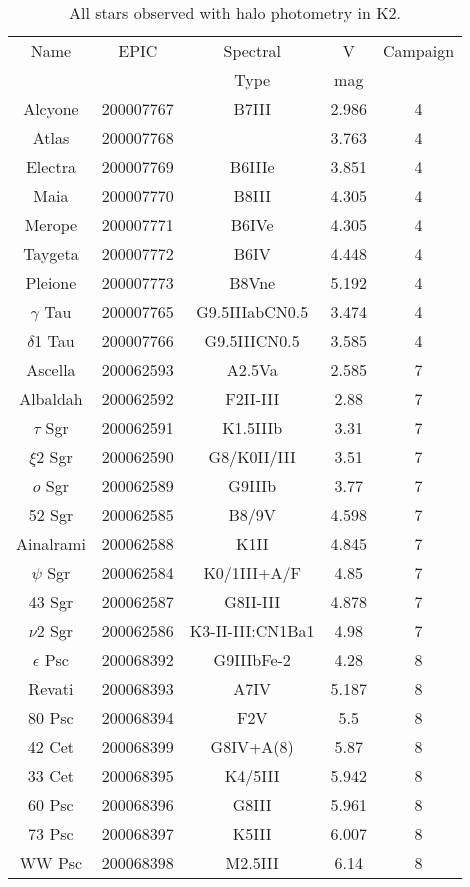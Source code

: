 \begin{table*}
\caption{All stars observed with halo photometry in K2.\label{table_all}}
\begin{tabular}{ccccc}
\hline \hline
Name & EPIC & Spectral & V & Campaign \\
 &  & Type & mag &  \\
\hline
Alcyone & 200007767 & B7III & 2.986 & 4 \\
Atlas & 200007768 &  & 3.763 & 4 \\
Electra & 200007769 & B6IIIe & 3.851 & 4 \\
Maia & 200007770 & B8III & 4.305 & 4 \\
Merope & 200007771 & B6IVe & 4.305 & 4 \\
Taygeta & 200007772 & B6IV & 4.448 & 4 \\
Pleione & 200007773 & B8Vne & 5.192 & 4 \\
$\gamma$ Tau & 200007765 & G9.5IIIabCN0.5 & 3.474 & 4 \\
$\delta$1 Tau & 200007766 & G9.5IIICN0.5 & 3.585 & 4 \\
Ascella & 200062593 & A2.5Va & 2.585 & 7 \\
Albaldah & 200062592 & F2II-III & 2.88 & 7 \\
$\tau$ Sgr & 200062591 & K1.5IIIb & 3.31 & 7 \\
$\xi$2 Sgr & 200062590 & G8/K0II/III & 3.51 & 7 \\
$o$ Sgr & 200062589 & G9IIIb & 3.77 & 7 \\
52 Sgr & 200062585 & B8/9V & 4.598 & 7 \\
Ainalrami & 200062588 & K1II & 4.845 & 7 \\
$\psi$ Sgr & 200062584 & K0/1III+A/F & 4.85 & 7 \\
43 Sgr & 200062587 & G8II-III & 4.878 & 7 \\
$\nu$2 Sgr & 200062586 & K3-II-III:CN1Ba1 & 4.98 & 7 \\
$\epsilon$ Psc & 200068392 & G9IIIbFe-2 & 4.28 & 8 \\
Revati & 200068393 & A7IV & 5.187 & 8 \\
80 Psc & 200068394 & F2V & 5.5 & 8 \\
42 Cet & 200068399 & G8IV+A(8) & 5.87 & 8 \\
33 Cet & 200068395 & K4/5III & 5.942 & 8 \\
60 Psc & 200068396 & G8III & 5.961 & 8 \\
73 Psc & 200068397 & K5III & 6.007 & 8 \\
WW Psc & 200068398 & M2.5III & 6.14 & 8 \\

\end{tabular}
\end{table*}
